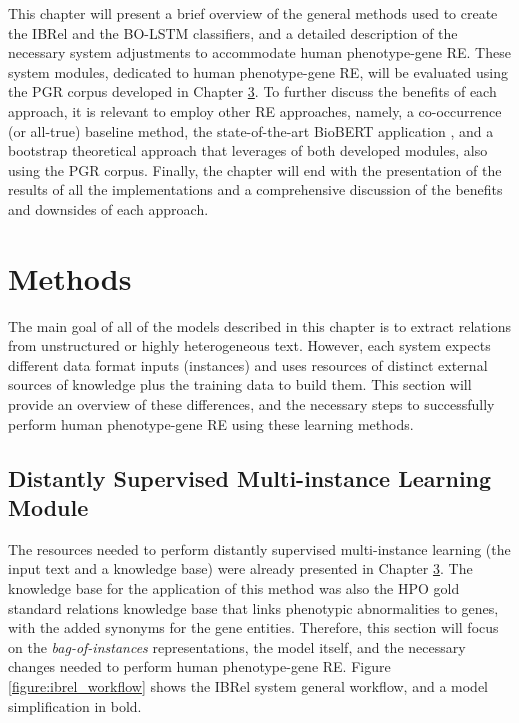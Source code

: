 This chapter will present a brief overview of the general methods used to create the IBRel and the BO-LSTM classifiers, and a detailed description of the necessary system adjustments to accommodate human phenotype-gene RE. These system modules, dedicated to human phenotype-gene RE, will be evaluated using the PGR corpus developed in Chapter \hyperlink{3}{3}. To further discuss the benefits of each approach, it is relevant to employ other RE approaches, namely, a co-occurrence (or all-true) baseline method, the state-of-the-art BioBERT application \citep{BIOBERT}, and a bootstrap theoretical approach that leverages of both developed modules, also using the PGR corpus. Finally, the chapter will end with the presentation of the results of all the implementations and a comprehensive discussion of the benefits and downsides of each approach.



\section{Methods}

The main goal of all of the models described in this chapter is to extract relations from unstructured or highly heterogeneous text. However, each system expects different data format inputs (instances) and uses resources of distinct external sources of knowledge plus the training data to build them. This section will provide an overview of these differences, and the necessary steps to successfully perform human phenotype-gene RE using these learning methods.



\hypertarget{4.1.1}{\subsection{Distantly Supervised Multi-instance Learning Module}}

The resources needed to perform distantly supervised multi-instance learning (the input text and a knowledge base) were already presented in Chapter \hyperlink{3}{3}. The knowledge base for the application of this method was also the HPO gold standard relations knowledge base that links phenotypic abnormalities to genes, with the added synonyms for the gene entities. Therefore, this section will focus on the \textit{bag-of-instances} representations, the model itself, and the necessary changes needed to perform human phenotype-gene RE. Figure \ref{figure:ibrel_workflow} shows the IBRel system general workflow, and a model simplification in bold.

